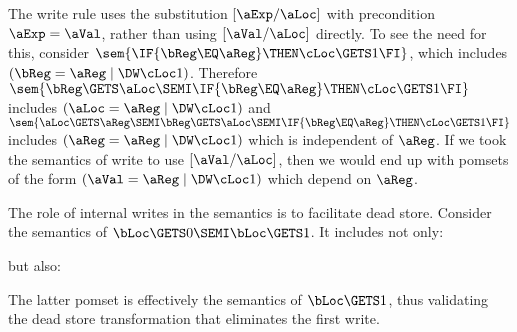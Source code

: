 The write rule uses the substitution $[\aExp/\aLoc]$ with
precondition $\aExp=\aVal$, rather than using $[\aVal/\aLoc]$ directly.
To see the need for this, consider
$\sem{\IF{\bReg\EQ\aReg}\THEN \cLoc\GETS 1\FI}$,
which includes
\begin{math}
(\bReg=\aReg \mid \DW\cLoc1)
\end{math}.
Therefore
$\sem{\bReg\GETS\aLoc\SEMI\IF{\bReg\EQ\aReg}\THEN \cLoc\GETS 1\FI}$
includes
\begin{math}
  (\aLoc=\aReg \mid \DW\cLoc1)
\end{math}
and
$\sem{\aLoc\GETS\aReg\SEMI\bReg\GETS\aLoc\SEMI\IF{\bReg\EQ\aReg}\THEN \cLoc\GETS 1\FI}$
includes
\begin{math}
  (\aReg=\aReg \mid \DW\cLoc1)
\end{math}
which is independent of $\aReg$.
%
If we took the semantics of write to use $[\aVal/\aLoc]$, then we would end
up with pomsets of the form
\begin{math}
  (\aVal=\aReg \mid \DW\cLoc1)
\end{math}
which depend on $\aReg$.

The role of internal writes in the semantics is to facilitate dead store.  Consider the semantics of $\bLoc\GETS0 \SEMI \bLoc\GETS1$.  It includes not only:
\begin{tikzdisplay}
\end{tikzdisplay}
but also:
\begin{tikzdisplay}
\end{tikzdisplay}
The latter pomset is effectively the semantics of $\bLoc\GETS1$, thus validating the dead store transformation that eliminates the first write.  
 
